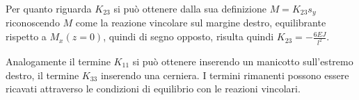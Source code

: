     Per quanto riguarda $K_{23}$ si può ottenere dalla sua definizione $M = K_{23}s_y$ riconoscendo $M$ come la reazione vincolare sul margine destro, equilibrante rispetto a $M_x(z=0)$, quindi di segno opposto, risulta quindi $K_{23} = -\frac{6EJ}{l^2}$.

    Analogamente il termine $K_{11}$ si può ottenere inserendo un manicotto sull'estremo destro, il termine $K_{33}$ inserendo una cerniera. I termini rimanenti possono essere ricavati attraverso le condizioni di equilibrio con le reazioni vincolari.



